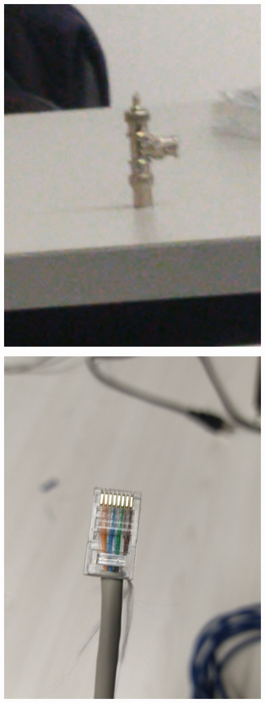 \documentclass[]{article}
\begin{document}
\includegraphics[scale=0.25]{a}

\includegraphics[scale=0.25]{b}
\end{document}

